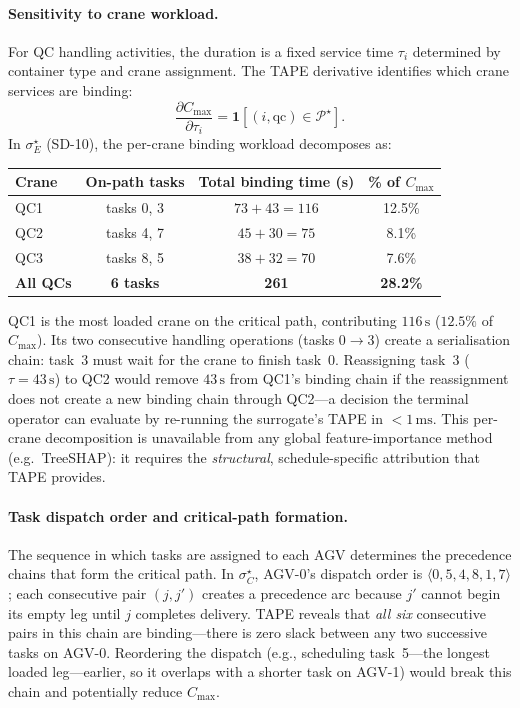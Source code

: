 \documentclass[11pt]{article}
\begin{document}
\paragraph{Sensitivity to crane workload.}
For QC handling activities, the duration is a fixed service time $\tau_i$ determined by
container type and crane assignment. The TAPE derivative identifies which crane services
are binding:
\begin{equation}\label{eq:crane_sens}
  \frac{\partial C_{\max}}{\partial \tau_i} = \mathbf{1}[(i,\text{qc})\in\mathcal{P}^\star].
\end{equation}
In $\sigma^\star_E$ (SD-10), the per-crane binding workload decomposes as:
\begin{center}\small
\begin{tabular}{lccc}
\toprule
Crane & On-path tasks & Total binding time (s) & \% of $C_{\max}$ \\
\midrule
QC1 & tasks 0, 3 & $73 + 43 = 116$ & 12.5\% \\
QC2 & tasks 4, 7 & $45 + 30 = 75$  &  8.1\% \\
QC3 & tasks 8, 5 & $38 + 32 = 70$  &  7.6\% \\
\midrule
\textbf{All QCs} & \textbf{6 tasks} & \textbf{261} & \textbf{28.2\%} \\
\bottomrule
\end{tabular}
\end{center}
QC1 is the most loaded crane on the critical path, contributing $116\,\mathrm{s}$
($12.5\%$ of $C_{\max}$). Its two consecutive handling operations (tasks $0 \to 3$)
create a serialisation chain: task~3 must wait for the crane to finish task~0.
Reassigning task~3 ($\tau=43\,\mathrm{s}$) to QC2 would remove
$43\,\mathrm{s}$ from QC1's binding chain if the reassignment does not create a new
binding chain through QC2---a decision the terminal operator can evaluate by re-running the
surrogate's TAPE in $<\!1\,\mathrm{ms}$. This per-crane decomposition is unavailable from
any global feature-importance method (e.g.\ TreeSHAP): it requires the \emph{structural},
schedule-specific attribution that TAPE provides.

\paragraph{Task dispatch order and critical-path formation.}
The sequence in which tasks are assigned to each AGV determines the precedence chains that
form the critical path. In $\sigma^\star_C$, AGV-0's dispatch order is
$\langle 0, 5, 4, 8, 1, 7\rangle$; each consecutive pair $(j, j')$ creates a precedence
arc because $j'$ cannot begin its empty leg until $j$ completes delivery. TAPE reveals that
\emph{all six} consecutive pairs in this chain are binding---there is zero slack between any
two successive tasks on AGV-0. Reordering the dispatch (e.g., scheduling task~5---the
longest loaded leg---earlier, so it overlaps with a shorter task on AGV-1) would
break this chain and potentially reduce $C_{\max}$.
\end{document}
